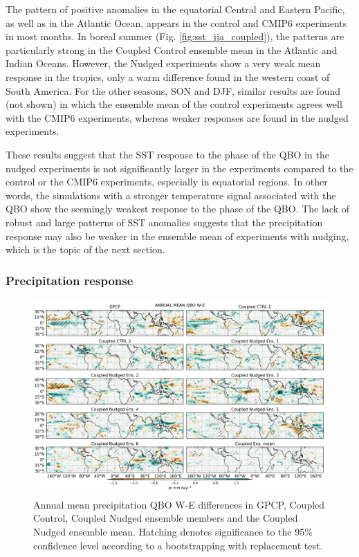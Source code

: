 The pattern of positive anomalies in the equatorial Central and Eastern Pacific, as well as in the Atlantic Ocean, appears in the control and CMIP6 experiments in most months. 
In boreal summer (Fig. \ref{fig:sst_jja_coupled}), the patterns are particularly strong in the Coupled Control ensemble mean in the Atlantic and Indian Oceans. However, the Nudged experiments show a very weak mean response in the tropics, only a warm difference found in the western coast of South America. 
For the other seasons, SON and DJF, similar results are found (not shown) in which the ensemble mean of the control experiments agrees well with the CMIP6 experiments, whereas weaker responses are found in the nudged experiments.

These results suggest that the SST response to the phase of the QBO in the nudged experiments is not significantly larger in the experiments compared to the control or the CMIP6 experiments, especially in equatorial regions. 
In other words, the simulations with a stronger temperature signal associated with the QBO show the seemingly weakest response to the phase of the QBO.
The lack of robust and large patterns of SST anomalies suggests that the precipitation response may also be weaker in the ensemble mean of experiments with nudging, which is the topic of the next section.

\subsubsection{Precipitation response}

\begin{figure}[t!]
\centering
 \includegraphics[width=\linewidth]{figures/pr_check_climqbowqboe.png}
\caption[Precipitation response to the QBO in coupled nudged experiments]{ Annual mean precipitation QBO W-E differences in GPCP, Coupled Control, Coupled Nudged ensemble members and the Coupled Nudged ensemble mean. Hatching denotes significance to the 95\% confidence level according to a bootstrapping with replacement test.}
\label{fig:pr_clim_coupled}
\end{figure}


